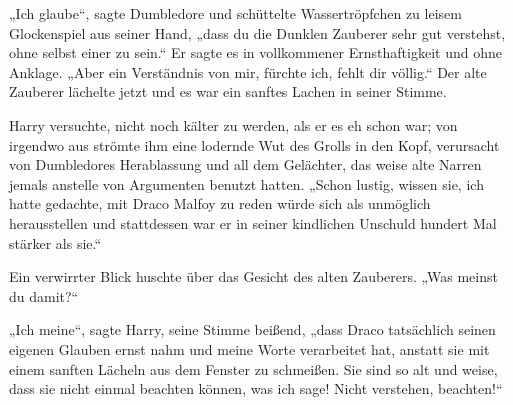 „Ich glaube“, sagte Dumbledore und schüttelte Wassertröpfchen zu leisem Glockenspiel aus seiner Hand, „dass du die Dunklen Zauberer sehr gut verstehst, ohne selbst einer zu sein.“ Er sagte es in vollkommener Ernsthaftigkeit und ohne Anklage.
„Aber ein Verständnis von mir, fürchte ich, fehlt dir völlig.“ Der alte Zauberer lächelte jetzt und es war ein sanftes Lachen in seiner Stimme.

Harry versuchte, nicht noch kälter zu werden, als er es eh schon war; von irgendwo aus strömte ihm eine lodernde Wut des Grolls in den Kopf, verursacht von Dumbledores Herablassung und all dem Gelächter, das weise alte Narren jemals anstelle von Argumenten benutzt hatten.
„Schon lustig, wissen sie, ich hatte gedachte, mit Draco Malfoy zu reden würde sich als unmöglich herausstellen und stattdessen war er in seiner kindlichen Unschuld hundert Mal stärker als sie.“

Ein verwirrter Blick huschte über das Gesicht des alten Zauberers.
„Was meinst du damit?“

„Ich meine“, sagte Harry, seine Stimme beißend, „dass Draco tatsächlich seinen eigenen Glauben ernst nahm und meine Worte verarbeitet hat, anstatt sie mit einem sanften Lächeln aus dem Fenster zu schmeißen. Sie sind so alt und weise, dass sie nicht einmal beachten können, was ich sage! Nicht verstehen, beachten!“

